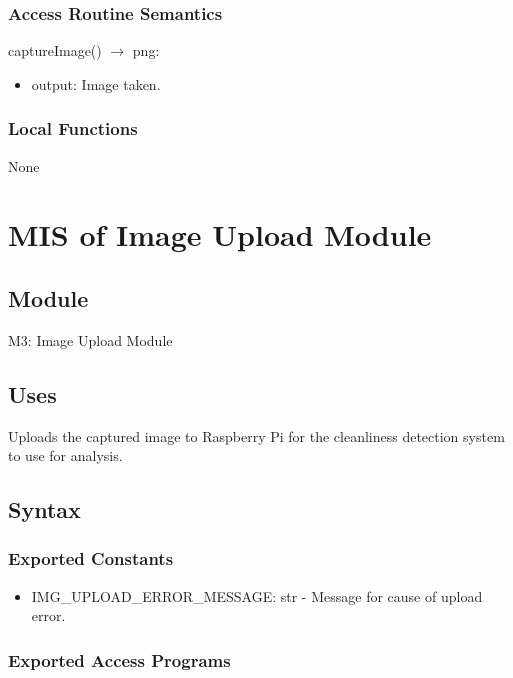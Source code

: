 \documentclass[12pt, titlepage]{article}
\begin{document}
\subsubsection{Access Routine Semantics}

\noindent captureImage() $\rightarrow$ png:
\begin{itemize}
\item output: Image taken.
\end{itemize}


\subsubsection{Local Functions}
None

\newpage


\section{MIS of Image Upload Module} \label{Module} 

\subsection{Module}

M3: Image Upload Module

\subsection{Uses}
Uploads the captured image to Raspberry Pi for the cleanliness detection system to use for analysis.

\subsection{Syntax}

\subsubsection{Exported Constants}
\begin{itemize}
  \item IMG{\_}UPLOAD{\_}ERROR{\_}MESSAGE: str - Message for cause of upload error.
\end{itemize}

\subsubsection{Exported Access Programs}
\end{document}
